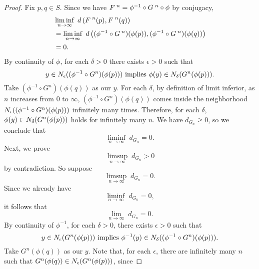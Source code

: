 \documentclass[10pt,draft,twoside]{book}
\begin{document}
\begin{theorem}
\begin{proof}
    Fix $p,q \in S$.
    Since we have $F^{\;n} = \phi^{-1}\circ G^{\;n}\circ\phi$ by conjugacy,
    \begin{align*}
      &\liminf\limits_{n \to \infty}\; d\left( F^{\;n}(p) , F^{\;n}(q) \right) \\
      &= \liminf\limits_{n \to \infty}\; d\left( (\phi^{-1}\circ G^{\;n})(\phi(p)) , (\phi^{-1}\circ G^{\;n})(\phi(q)) \right) \\
      &= 0.
    \end{align*}
  By continuity of $\phi$, for each $\delta > 0$ there exists $\epsilon>0$ such that 
  \begin{equation*}
    y \in N_{\epsilon}((\phi^{-1}\circ G^n)(\phi(p))) \mbox{ implies } \phi(y) \in N_{\delta}(G^n(\phi(p))).
  \end{equation*}
  Take $(\phi^{-1}\circ G^n)(\phi(q))$ as our $y$.
  For each $\delta$, by definition of limit inferior, as $n$ increases from $0$ to $\infty$, $(\phi^{-1}\circ G^n)(\phi(q))$ comes inside the neighborhood $N_{\epsilon}((\phi^{-1}\circ G^n)(\phi(p)))$ infinitely many times.
  Therefore, for each $\delta$, $\phi(y) \in N_{\delta}(G^n(\phi(p)))$ holds for infinitely many $n$.
  We have $d_{G_n} \geq 0$, so we conclude that
  \begin{equation*}
    \liminf\limits_{n \to \infty}\; d_{G_n} = 0.
  \end{equation*}
  Next, we prove
  \begin{equation*}
    \limsup\limits_{n \to \infty}\; d_{G_n} > 0
  \end{equation*}
  by contradiction.
  So suppose
  \begin{equation*}
    \limsup\limits_{n \to \infty}\; d_{G_n} = 0.
  \end{equation*}
  Since we already have
  \begin{equation*}
    \liminf\limits_{n \to \infty}\; d_{G_n} = 0,
  \end{equation*}
  it follows that 
  \begin{equation*}
    \lim\limits_{n \to \infty}\; d_{G_n} = 0.
  \end{equation*}
  By continuity of $\phi^{-1}$, for each $\delta > 0$, there exists $\epsilon > 0$ such that
  \begin{equation*}
    y \in N_{\epsilon}(G^n(\phi(p))) \mbox{ implies } \phi^{-1}(y) \in N_{\delta}((\phi^{-1} \circ G^n)(\phi(p))).
  \end{equation*}
  Take $G^n(\phi(q))$ as our $y$.
  Note that, for each $\epsilon$, there are infinitely many $n$ such that $G^n(\phi(q)) \in N_{\epsilon}(G^n(\phi(p)))$, since 

\end{proof}
\end{theorem}
\end{document}
